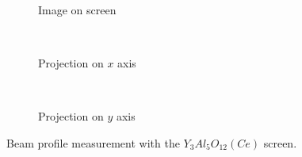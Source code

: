 \begin{figure}[!ht]
	\begin{subfigure}[t]{0.3\textwidth}
		
		\caption{Image on screen}
		\label{}
	\end{subfigure}
	~
	\begin{subfigure}[t]{0.3\textwidth}
		
		\caption{Projection on $x$ axis}
		\label{}
  \end{subfigure}
  ~
  \begin{subfigure}[t]{0.3\textwidth}
		
		\caption{Projection on $y$ axis}
		\label{}
  \end{subfigure}
	\caption[Beam profile measurement with the $Y_{3}Al_{5}O_{12}(Ce)$ screen]{Beam profile measurement with the $Y_{3}Al_{5}O_{12}(Ce)$ screen.}
	\label{chap4:ScreenBeam}
\end{figure}